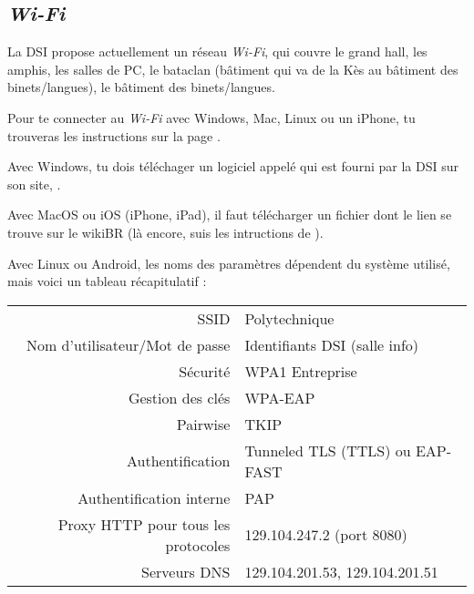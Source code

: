 \subsection{\emph{Wi-Fi}}
La DSI propose actuellement un réseau \emph{Wi-Fi}, qui couvre le grand hall, les amphis, les salles de PC, le bataclan (bâtiment qui va de la Kès au bâtiment des
binets/langues), le bâtiment des binets/langues.

Pour te connecter au \emph{Wi-Fi} avec Windows, Mac, Linux ou un iPhone, tu trouveras les instructions sur la page .

Avec Windows, tu dois t\'el\'echager un logiciel appel\'e  qui est fourni par la DSI sur son site, .

Avec MacOS ou iOS (iPhone, iPad), il faut t\'el\'echarger un fichier  dont le lien se trouve sur le wikiBR (l\`a encore, suis les intructions de ).

Avec Linux ou Android, les noms des param\`etres d\'ependent du syst\`eme utilis\'e, mais voici un tableau r\'ecapitulatif :
\begin{center}
\begin{tabular}{|r|l|}
 SSID & Polytechnique \\
 Nom d'utilisateur/Mot de passe & Identifiants DSI (salle info) \\
 S\'ecurit\'e & WPA1 Entreprise \\
 Gestion des cl\'es & WPA-EAP \\
 Pairwise & TKIP \\
 Authentification & Tunneled TLS (TTLS) ou EAP-FAST \\
 Authentification interne & PAP \\
 Proxy HTTP pour tous les protocoles & 129.104.247.2 (port 8080) \\
 Serveurs DNS & 129.104.201.53, 129.104.201.51
\end{tabular}
\end{center}






